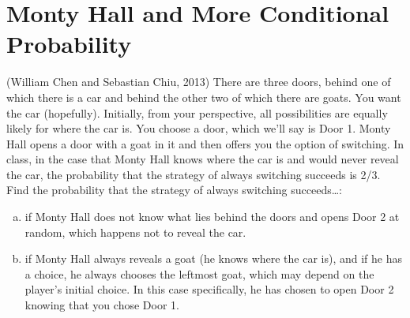 \documentclass{article}
\begin{document}
 

\header

\section{Monty Hall and More Conditional Probability}

(William Chen and Sebastian Chiu, 2013) There are three doors, behind one of which there is a car and behind the other two of which there are goats. You want the car (hopefully). Initially, from your perspective, all possibilities are equally likely for where the car is. You choose a door, which we'll say is Door 1. Monty Hall opens a door with a goat in it and then offers you the option of switching. In class, in the case that Monty Hall knows where the car is and would never reveal the car, the probability that the strategy of always switching succeeds is 2/3. Find the probability that the strategy of always switching succeeds\dots:

\begin{enumerate}[(a)]
    \item if Monty Hall does not know what lies behind the doors and opens Door 2 at random, which happens not to reveal the car.
    
    
    \item if Monty Hall always reveals a goat (he knows where the car is), and if he has a choice, he always chooses the leftmost goat, which may depend on the player's initial choice. In this case specifically, he has chosen to open Door 2 knowing that you chose Door 1.
    
    
\end{enumerate}
\end{document}
